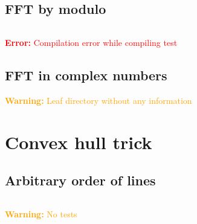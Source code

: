 \documentclass{article}
\begin{document}
\subsection{FFT by modulo}
\inputminted[mathescape, breaklines, tabsize=4, frame=lines, linenos=true]{c++}{./fft/mod/mod_fft.cpp}
\textcolor{red}{\textbf{Error:} Compilation error while compiling test}
\subsection{FFT in complex numbers}
\textcolor{orange}{\textbf{Warning:} Leaf directory without any information}
\section{Convex hull trick}
\subsection{Arbitrary order of lines}
\inputminted[mathescape, breaklines, tabsize=4, frame=lines, linenos=true]{c++}{./convex-hull-trick/full/full_cht.cpp}
\textcolor{orange}{\textbf{Warning:} No tests}
\end{document}
